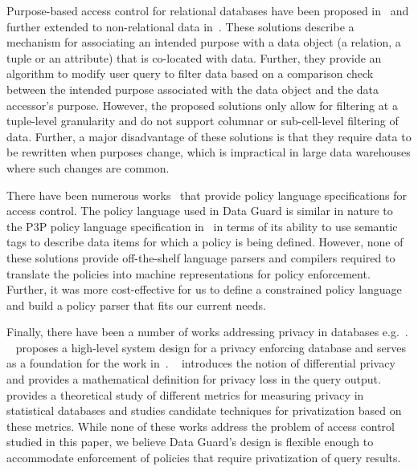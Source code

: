 Purpose-based access control for relational databases have been proposed in~\cite{Byun05, Bertino05} and further extended to non-relational data in~\cite{Byun08}. These solutions describe a mechanism for associating an intended purpose with a data object (a relation, a tuple or an attribute) that is co-located with data. Further, they provide an algorithm to modify user query to filter data based on a comparison check between the intended purpose associated with the data object and the data accessor's purpose. However, the proposed solutions only allow for filtering at a tuple-level granularity and do not support columnar or sub-cell-level filtering of data. Further, a major disadvantage of these solutions is that they require data to be rewritten when purposes change, which is impractical in large data warehouses where such changes are common. 

There have been numerous works~\cite{Cranor02,Ni08,Xacml3} that provide policy language specifications for access control. The policy language used in Data Guard is similar in nature to the P3P policy language specification in~\cite{Cranor02} in terms of its ability to use semantic tags to describe data items for which a policy is being defined. However, none of these solutions provide off-the-shelf language parsers and compilers required to translate the policies into machine representations for policy enforcement. Further, it was more cost-effective for us to define a constrained policy language and build a policy parser that fits our current needs. 

Finally, there have been a number of works addressing privacy in databases e.g.~\cite{Agrawal02, Chawla05, Dwork06}. ~\cite{Agrawal02} proposes a high-level system design for a privacy enforcing database and serves as a foundation for the work in~\cite{Agrawal05}. ~\cite{Dwork06} introduces the notion of differential privacy and provides a mathematical definition for privacy loss in the query output. ~\cite{Chawla05} provides a theoretical study of different metrics for measuring privacy in statistical databases and studies candidate techniques for privatization based on these metrics. While none of these works address the problem of access control studied in this paper, we believe Data Guard's design is flexible enough to accommodate enforcement of policies that require privatization of query results. 
